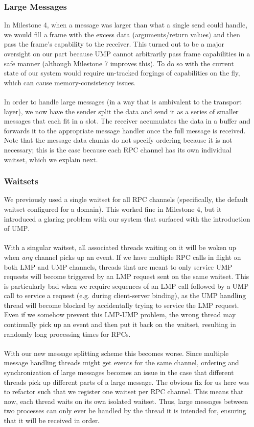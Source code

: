 \subsubsection{Large Messages}
In Milestone 4, when a message was larger than what a single send could handle, we would fill a frame with the excess data (arguments/return values) and then pass the frame's capability to the receiver. This turned out to be a major oversight on our part because UMP cannot arbitrarily pass frame capabilities in a safe manner (although Milestone 7 improves this). To do so with the current state of our system would require un-tracked forgings of capabilities on the fly, which can cause memory-consistency issues.
\\\\
In order to handle large messages (in a way that is ambivalent to the transport layer), we now have the sender split the data and send it as a series of smaller messages that each fit in a slot. The receiver accumulates the data in a buffer and forwards it to the appropriate message handler once the full message is received. Note that the message data chunks do not specify ordering because it is not necessary; this is the case because each RPC channel has its own individual waitset, which we explain next.

\subsubsection{Waitsets}
We previously used a single waitset for all RPC channels (specifically, the default waitset configured for a domain). This worked fine in Milestone 4, but it introduced a glaring problem with our system that surfaced with the introduction of UMP.
\\\\
With a singular waitset, all associated threads waiting on it will be woken up when \textit{any} channel picks up an event. If we have multiple RPC calls in flight on both LMP and UMP channels, threads that are meant to only service UMP requests will become triggered by an LMP request sent on the same waitset. This is particularly bad when we require sequences of an LMP call followed by a UMP call to service a request (e.g. during client-server binding), as the UMP handling thread will become blocked by accidentally trying to service the LMP request. Even if we somehow prevent this LMP-UMP problem, the wrong thread may continually pick up an event and then put it back on the waitset, resulting in randomly long processing times for RPCs.
\\\\
With our new message splitting scheme this becomes worse. Since multiple message handling threads might get events for the same channel, ordering and synchronization of large messages becomes an issue in the case that different threads pick up different parts of a large message. The obvious fix for us here was to refactor such that we register one waitset per RPC channel. This means that now, each thread waits on its own isolated waitset. Thus, large messages between two processes can only ever be handled by the thread it is intended for, ensuring that it will be received in order.

